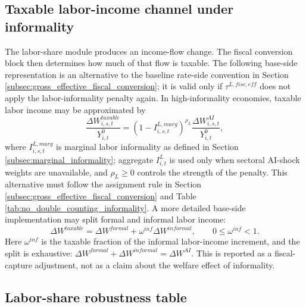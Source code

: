 \documentclass[11pt,a4paper]{article}
\begin{document}
\subsection{Taxable labor-income channel under informality}

The labor-share module produces an income-flow change. The fiscal conversion block then determines how much of that flow is taxable. The following base-side representation is an alternative to the baseline rate-side convention in Section \ref{subsec:gross_effective_fiscal_conversion}; it is valid only if $\tau^{L,fisc,eff}$ does not apply the labor-informality penalty again. In high-informality economies, taxable labor income may be approximated by
\begin{equation}\label{eq:labor_informality_base_side_v25}
    \frac{\Delta W^{taxable}_{i,s,t}}{Y^0_{i,t}}
    =
    (1-I^{L,marg}_{i,s,t})^{\rho_L}
    \frac{\Delta W^{AI}_{i,s,t}}{Y^0_{i,t}},
\end{equation}
where $I^{L,marg}_{i,s,t}$ is marginal labor informality as defined in Section \ref{subsec:marginal_informality}; aggregate $I^L_{i,t}$ is used only when sectoral AI-shock weights are unavailable, and $\rho_L\geq0$ controls the strength of the penalty. This alternative must follow the assignment rule in Section \ref{subsec:gross_effective_fiscal_conversion} and Table \ref{tab:no_double_counting_informality}. A more detailed base-side implementation may split formal and informal labor income:
\begin{equation}
    \Delta W^{taxable}=\Delta W^{formal}+\omega^{inf}\Delta W^{informal},
    \qquad 0\leq \omega^{inf}<1.
\end{equation}
Here $\omega^{inf}$ is the taxable fraction of the informal labor-income increment, and the split is exhaustive: $\Delta W^{formal}+\Delta W^{informal}=\Delta W^{AI}$. This is reported as a fiscal-capture adjustment, not as a claim about the welfare effect of informality.

\subsection{Labor-share robustness table}
\end{document}
